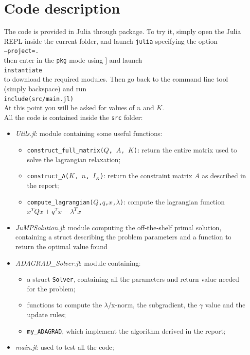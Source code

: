 \documentclass[notitlepage]{article}
\begin{document}
\section{Code description}

The code is provided in Julia through package. To try it, simply open the Julia REPL inside the current folder, and launch \texttt{julia} specifying the option\\
\quad\quad\texttt{--project=.}\\
then enter in the \texttt{pkg} mode using $]$ and launch\\
\quad\texttt{instantiate}\\
to download the required modules. Then go back to the command line tool (simply backspace) and run\\
\quad\texttt{include(src/main.jl)}\\ 
At this point you will be asked for values of $n$ and $K$.\\
All the code is contained inside the \texttt{src} folder:
\begin{itemize}
  \item \textit{Utils.jl}: module containing some useful functions:
  \begin{itemize}
    \item \texttt{construct\_full\_matrix($Q$, $A$, $K$)}: return the entire matrix used to solve the lagrangian relaxation;
    \item \texttt{construct\_A($K$, $n$, $I_K$)}: return the constraint matrix $A$ as described in the report;
    \item \texttt{compute\_lagrangian($Q$,$q$,$x$,$\lambda$)}: compute the lagrangian function $x^T Q x + q^T x - \lambda^T x$
  \end{itemize}
  \item \textit{JuMPSolution.jl}: module computing the off-the-shelf primal solution, containing a struct describing the problem parameters and a function to return the optimal value found
  \item \textit{ADAGRAD\_Solver.jl}: module containing:
  \begin{itemize}
    \item a struct \texttt{Solver}, containing all the parameters and return value needed for the problem;
    \item functions to compute the $\lambda$/x-norm, the subgradient, the $\gamma$ value and the update rules;
    \item \texttt{my\_ADAGRAD}, which implement the algorithm derived in the report;
  \end{itemize}
  \item \textit{main.jl}: used to test all the code;
\end{itemize}
\end{document}
